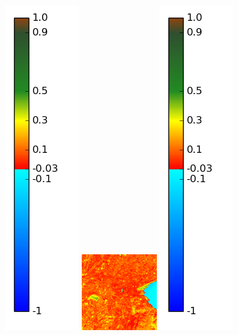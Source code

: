 \documentclass{book}
\begin{document}
\begin{figure}[H]
{\includegraphics[scale=0.2]{images/colormap.png}
\includegraphics[scale=0.7]{images/Annecy/11_ndvi.png}
\includegraphics[scale=0.2]{images/colormap.png}
}
\end{figure}
\end{document}

